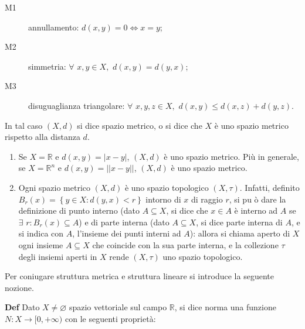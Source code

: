 \documentclass{article}
\begin{document}
\begin{description}
\item[M1] annullamento: $d\left( x,y\right) =0\Longleftrightarrow x=y$;

\item[M2] simmetria: $\forall $ $x,y\in X,$ $d\left( x,y\right) =d\left(
y,x\right) $;

\item[M3] disuguaglianza triangolare: $\forall $ $x,y,z\in X,$ $d\left(
x,y\right) \leq d\left( x,z\right) +d\left( y,z\right) $.
\end{description}

In tal caso $\left( X,d\right) $ si dice spazio metrico, o si dice che $X$ 
\`{e} uno spazio metrico rispetto alla distanza $d$.

\begin{enumerate}
\item Se $X=%
\mathbb{R}
$ e $d\left( x,y\right) =\left\vert x-y\right\vert $, $\left( X,d\right) $ 
\`{e} uno spazio metrico. Pi\`{u} in generale, se $X=%
\mathbb{R}
^{n}$ e $d\left( x,y\right) =\left\vert \left\vert x-y\right\vert
\right\vert $, $\left( X,d\right) $ \`{e} uno spazio metrico.

\item Ogni spazio metrico $\left( X,d\right) $ \`{e} uno spazio topologico $%
\left( X,\tau \right) $. Infatti, definito $B_{r}\left( x\right) =\left\{
y\in X:d\left( y,x\right) <r\right\} $ intorno di $x$ di raggio $r$, si pu%
\`{o} dare la definizione di punto interno (dato $A\subseteq X$, si dice che 
$x\in A$ \`{e} interno ad $A$ se $\exists $ $r:B_{r}\left( x\right)
\subseteq A$) e di parte interna (dato $A\subseteq X$, si dice parte interna
di $A$, e si indica con $A$, l'insieme dei punti interni ad $A$): allora si
chiama aperto di $X$ ogni insieme $A\subseteq X$ che coincide con la sua
parte interna, e la collezione $\tau $ degli insiemi aperti in $X$ rende $%
\left( X,\tau \right) $ uno spazio topologico.
\end{enumerate}

Per coniugare struttura metrica e struttura lineare si introduce la seguente
nozione.

\textbf{Def} Dato $X\neq \varnothing $ spazio vettoriale sul campo $%
\mathbb{R}
$, si dice norma una funzione $N:X\rightarrow \lbrack 0,+\infty )$ con le
seguenti propriet\`{a}:
\end{document}
